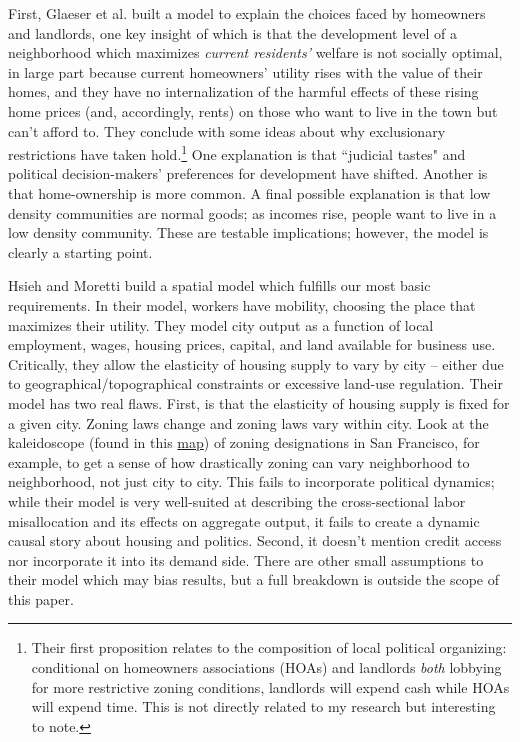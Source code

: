 \documentclass{article}[11pt]
\begin{document}
First, Glaeser et al. built a model to explain the choices faced by homeowners and landlords, one key insight of which is that the development level of a neighborhood which maximizes \textit{current residents'} welfare is not socially optimal, in large part because current homeowners' utility rises with the value of their homes, and they have no internalization of the harmful effects of these rising home prices (and, accordingly, rents) on those who want to live in the town but can't afford to. \citep{glaeser2005} They conclude with some ideas about why exclusionary restrictions have taken hold.\footnote{Their first proposition relates to the composition of local political organizing: conditional on homeowners associations (HOAs) and landlords \textit{both} lobbying for more restrictive zoning conditions, landlords will expend cash while HOAs will expend time. This is not directly related to my research but interesting to note.} One explanation is that ``judicial tastes" and political decision-makers' preferences for development have shifted. Another is that home-ownership is more common. A final possible explanation is that low density communities are normal goods; as incomes rise, people want to live in a low density community. These are testable implications; however, the model is clearly a starting point.

Hsieh and Moretti build a spatial model which fulfills our most basic requirements. \citep{hsieh2019housing} In their model, workers have mobility, choosing the place that maximizes their utility. They model city output as a function of local employment, wages, housing prices, capital, and land available for business use. Critically, they allow the elasticity of housing supply to vary by city -- either due to geographical/topographical constraints or excessive land-use regulation. Their model has two real flaws. First, is that the elasticity of housing supply is fixed for a given city. Zoning laws change and zoning laws vary within city. Look at the kaleidoscope (found in this \href{https://sfplanninggis.s3.amazonaws.com/hub/BIGmap.pdf}{map}) of zoning designations in San Francisco, for example, to get a sense of how drastically zoning can vary neighborhood to neighborhood, not just city to city. This fails to incorporate political dynamics; while their model is very well-suited at describing the cross-sectional labor misallocation and its effects on aggregate output, it fails to create a dynamic causal story about housing and politics. Second, it doesn't mention credit access nor incorporate it into its demand side. There are other small assumptions to their model which may bias results, but a full breakdown is outside the scope of this paper. 
\end{document}
